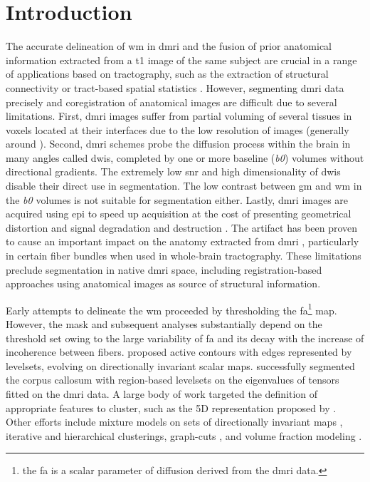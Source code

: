 \section{Introduction}\label{sec:introduction}
The accurate delineation of \gls*{wm} in \gls*{dmri} and the fusion of prior
  anatomical information extracted from a \gls*{t1} image of the same subject
  are crucial in a range of applications based on tractography, such as
  the extraction of structural connectivity \citep{craddock_imaging_2013} or
  tract-based spatial statistics \citep{smith_tractbased_2006}.
However, segmenting \gls*{dmri} data precisely and coregistration of anatomical
  images are difficult due to several limitations.
First, \gls{dmri} images suffer from partial voluming of several tissues in 
  voxels located at their interfaces due to the low resolution of images
  (generally around ).
Second, \gls*{dmri} schemes probe the diffusion process within the brain in 
  many angles called \glspl*{dwi}, completed by one or more baseline (\emph{b0}) 
  volumes without directional gradients.
The extremely low \gls*{snr} and high dimensionality of \glspl*{dwi} disable their
  direct use in segmentation.
The low contrast between \gls*{gm} and \gls*{wm} in the \emph{b0} volumes is not suitable for 
  segmentation either.
Lastly, \gls*{dmri} images are acquired using \gls*{epi} to speed up acquisition
  at the cost of presenting geometrical distortion and signal degradation and
  destruction \citep{jezzard_correction_1995}.
The artifact has been proven to cause an important impact on the anatomy extracted
  from \gls*{dmri} \citep{irfanoglu_effects_2012}, particularly in certain fiber bundles
  when used in whole-brain tractography.
These limitations preclude segmentation in native \gls*{dmri} space, including
  registration-based approaches using anatomical images as source of structural
  information.


Early attempts to delineate the \gls*{wm} proceeded by thresholding the 
  \gls*{fa}\footnote{the \gls*{fa} is a scalar parameter of diffusion derived from
  the \gls*{dmri} data.} map.
However, the mask and subsequent analyses substantially depend on the threshold set
  \citep{taoka_fractional_2009} owing to the large variability of \gls*{fa} and its
  decay with the increase of incoherence between fibers.
\cite{zhukov_level_2003} proposed active contours with edges represented
  by levelsets, evolving on directionally invariant scalar maps.
\cite{rousson_level_2004} successfully segmented the corpus callosum with
  region-based levelsets on the eigenvalues of tensors fitted on the
  \gls*{dmri} data.
A large body of work targeted the definition of appropriate features to cluster,
  such as the 5D representation proposed by \cite{jonasson_segmentation_2005}.
Other efforts include mixture models on sets of directionally invariant maps
  \citep{liu_brain_2007}, iterative \citep{hadjiprocopis_unbiased_2005} and
  hierarchical \citep{lu_segmentation_2008} clusterings,
  graph-cuts \citep{han_experimental_2009},
  and volume fraction modeling \citep{kumazawa_improvement_2013}.
 
